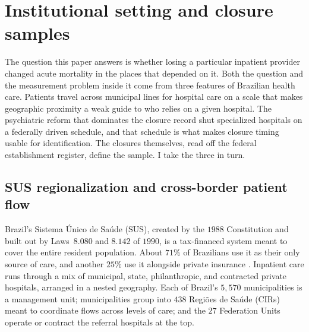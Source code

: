 \section{Institutional setting and closure samples}
\label{sec:setting}

The question this paper answers is whether losing a particular inpatient
provider changed acute mortality in the places that depended on it. Both
the question and the measurement problem inside it come from three
features of Brazilian health care. Patients travel across municipal lines
for hospital care on a scale that makes geographic proximity a weak guide
to who relies on a given hospital. The psychiatric reform that dominates
the closure record shut specialized hospitals on a federally driven
schedule, and that schedule is what makes closure timing usable for
identification. The closures themselves, read off the federal
establishment register, define the sample. I take the three in turn.

\subsection{SUS regionalization and cross-border patient flow}
\label{sec:setting-sus}

Brazil's Sistema Único de Saúde (SUS), created by the $1988$ Constitution
and built out by Laws~$8.080$ and $8.142$ of $1990$, is a tax-financed
system meant to cover the entire resident population. About $71\%$ of
Brazilians use it as their only source of care, and another $25\%$ use it
alongside private insurance \citep{macinkoHarris2015}. Inpatient care
runs through a mix of municipal, state, philanthropic, and contracted
private hospitals, arranged in a nested geography. Each of Brazil's
$5{,}570$ municipalities is a management unit; municipalities group into
$438$ Regiões de Saúde (CIRs) meant to coordinate flows across levels of
care; and the $27$ Federation Units operate or contract the referral
hospitals at the top.

